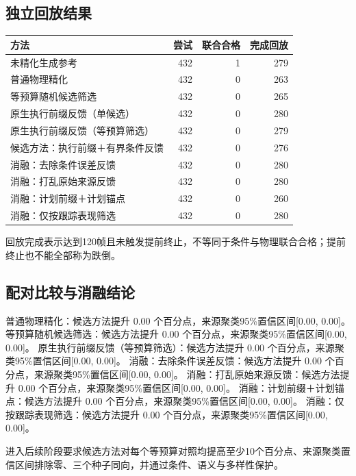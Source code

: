 \subsection{独立回放结果}
\begin{center}\small
\begin{tabular}{p{6.5cm}rrr}\hline
方法 & 尝试 & 联合合格 & 完成回放 \\\hline
未精化生成参考 & 432 & 1 & 279\\
普通物理精化 & 432 & 0 & 263\\
等预算随机候选筛选 & 432 & 0 & 265\\
原生执行前缀反馈（单候选） & 432 & 0 & 280\\
原生执行前缀反馈（等预算筛选） & 432 & 0 & 279\\
候选方法：执行前缀＋有界条件反馈 & 432 & 0 & 276\\
消融：去除条件误差反馈 & 432 & 0 & 280\\
消融：打乱原始来源反馈 & 432 & 0 & 280\\
消融：计划前缀＋计划锚点 & 432 & 0 & 260\\
消融：仅按跟踪表现筛选 & 432 & 0 & 280\\
\hline\end{tabular}\end{center}

回放完成表示达到120帧且未触发提前终止，不等同于条件与物理联合合格；提前终止也不能全部称为跌倒。
\subsection{配对比较与消融结论}
普通物理精化：候选方法提升 0.00 个百分点，来源聚类95\%置信区间[0.00, 0.00]。
等预算随机候选筛选：候选方法提升 0.00 个百分点，来源聚类95\%置信区间[0.00, 0.00]。
原生执行前缀反馈（等预算筛选）：候选方法提升 0.00 个百分点，来源聚类95\%置信区间[0.00, 0.00]。
消融：去除条件误差反馈：候选方法提升 0.00 个百分点，来源聚类95\%置信区间[0.00, 0.00]。
消融：打乱原始来源反馈：候选方法提升 0.00 个百分点，来源聚类95\%置信区间[0.00, 0.00]。
消融：计划前缀＋计划锚点：候选方法提升 0.00 个百分点，来源聚类95\%置信区间[0.00, 0.00]。
消融：仅按跟踪表现筛选：候选方法提升 0.00 个百分点，来源聚类95\%置信区间[0.00, 0.00]。

进入后续阶段要求候选方法对每个等预算对照均提高至少10个百分点、来源聚类置信区间排除零、三个种子同向，并通过条件、语义与多样性保护。
